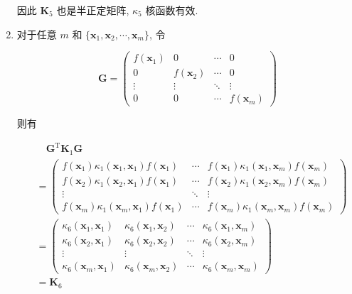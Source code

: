 \documentclass[answers]{exam}  %
\begin{document}
\begin{questions}
\begin{solution}
\begin{enumerate}
            因此 $\bm{K}_5$ 也是半正定矩阵, $\kappa_5$ 核函数有效.

      \item

            对于任意 $m$ 和 $\{ \bm{x}_1, \bm{x}_2, \cdots, \bm{x}_{m} \}$, 令

            $$
              \bm{G} = \begin{pmatrix} f(\bm{x}_1) & 0 &\cdots & 0 \\ 0 & f(\bm{x}_2) & \cdots & 0 \\ \vdots & \vdots & \ddots & \vdots \\ 0 & 0 & \cdots & f(\bm{x}_m) \end{pmatrix}
            $$

            则有

            $$
              \begin{aligned}
                 & \quad \bm{G}^{\mathrm{T}}\bm{K}_1\bm{G}                                                                                                                                                                                                                                                                                                                                                                        \\
                 & = \begin{pmatrix} f(\bm{x}_1)\kappa_1(\bm{x}_1, \bm{x}_1)f(\bm{x}_1) &\cdots& f(\bm{x}_1)\kappa_1(\bm{x}_1, \bm{x}_m)f(\bm{x}_m) \\ f(\bm{x}_2)\kappa_1(\bm{x}_2, \bm{x}_1)f(\bm{x}_1) &\cdots& f(\bm{x}_2)\kappa_1(\bm{x}_2, \bm{x}_m)f(\bm{x}_m) \\ \vdots & \ddots & \vdots \\ f(\bm{x}_m)\kappa_1(\bm{x}_m, \bm{x}_1)f(\bm{x}_1) &\cdots& f(\bm{x}_m)\kappa_1(\bm{x}_m, \bm{x}_m)f(\bm{x}_m) \end{pmatrix} \\
                 & = \begin{pmatrix} \kappa_6(\bm{x}_1, \bm{x}_1) & \kappa_6(\bm{x}_1, \bm{x}_2) &\cdots& \kappa_6(\bm{x}_1, \bm{x}_m) \\ \kappa_6(\bm{x}_2, \bm{x}_1) & \kappa_6(\bm{x}_2, \bm{x}_2) &\cdots& \kappa_6(\bm{x}_2, \bm{x}_m) \\ \vdots & \vdots & \ddots & \vdots \\ \kappa_6(\bm{x}_m, \bm{x}_1) & \kappa_6(\bm{x}_m, \bm{x}_2) &\cdots& \kappa_6(\bm{x}_m, \bm{x}_m) \end{pmatrix}                               \\
                 & = \bm{K}_6                                                                                                                                                                                                                                                                                                                                                                                                     \\
              \end{aligned}
            $$


\end{enumerate}
\end{solution}
\end{questions}
\end{document}

